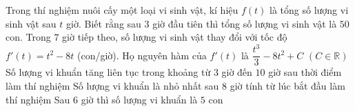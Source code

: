\begin{ex}%
	Trong thí nghiệm nuôi cấy một loại vi sinh vật, kí hiệu  $f(t)$ là tổng số lượng vi sinh vật sau $t$ giờ. Biết rằng sau $3$ giờ đầu tiên thì tổng số lượng vi sinh vật là $50$ con. Trong $7$ giờ tiếp theo, số lượng vi sinh vật thay đổi với tốc độ $f'(t)=t^2-8t$ (con/giờ).
	\choiceTF 
		{Họ nguyên hàm của $f'(t)$  là $\dfrac{{t^3}}{3}-8{t^2}+C$ $(C\in\mathbb{R})$}
		{Số lượng vi khuẩn tăng liên tục trong khoảng từ $3$ giờ đến $10$ giờ  sau thời điểm làm thí nghiệm}
		{\True Số lượng vi khuẩn là nhỏ nhất sau $8$ giờ tính từ lúc bắt đầu làm thí  nghiệm}
		{\True Sau $6$ giờ thì  số lượng vi khuẩn là $5$ con}
\end{ex}

